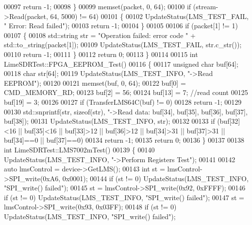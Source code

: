 \begin{DoxyCode}
00097         \textcolor{keywordflow}{return} -1;
00098     \}
00099     memset(packet, 0, 64);
00100     \textcolor{keywordflow}{if} (stream->Read(packet, 64, 5000) != 64)
00101     \{
00102         UpdateStatus(LMS_TEST_FAIL, \textcolor{stringliteral}{"  Error: Read failed"});
00103         \textcolor{keywordflow}{return} -1;
00104     \}
00105 
00106     \textcolor{keywordflow}{if} (packet[1] != 1)
00107     \{
00108         std::string str = \textcolor{stringliteral}{"Operation failed: error code "} + std::to\_string(packet[1]);
00109         UpdateStatus(LMS_TEST_FAIL, str.c\_str());
00110         \textcolor{keywordflow}{return} -1;
00111     \}
00112     \textcolor{keywordflow}{return} 0;
00113 \}
00114 
00115 \textcolor{keywordtype}{int} LimeSDRTest::FPGA_EEPROM_Test()
00116 \{
00117     \textcolor{keywordtype}{unsigned} \textcolor{keywordtype}{char} buf[64];
00118     \textcolor{keywordtype}{char} str[64];
00119     UpdateStatus(LMS_TEST_INFO, \textcolor{stringliteral}{"->Read EEPROM"});
00120 
00121     memset(buf, 0, 64);
00122     buf[0] = CMD_MEMORY_RD;
00123     buf[2] = 56;
00124     buf[13] = 7;                \textcolor{comment}{//read count}
00125     buf[19] = 3;
00126 
00127     \textcolor{keywordflow}{if} (TransferLMS64C(buf) != 0)
00128         \textcolor{keywordflow}{return} -1;
00129 
00130     std::snprintf(str, \textcolor{keyword}{sizeof}(str), \textcolor{stringliteral}{"->Read data: %
      buf[34], buf[35], buf[36], buf[37], buf[38]);
00131     UpdateStatus(LMS_TEST_INFO, str);
00132 
00133     \textcolor{keywordflow}{if} (buf[32]<16 || buf[35]<16 || buf[33]>12 || buf[36]>12 || buf[34]>31 || buf[37]>31 || buf[34]==0 || 
      buf[37]==0)
00134         \textcolor{keywordflow}{return} -1;
00135     \textcolor{keywordflow}{return} 0;
00136 \}
00137 
00138 \textcolor{keywordtype}{int} LimeSDRTest::LMS7002mTest()
00139 \{
00140     UpdateStatus(LMS_TEST_INFO, \textcolor{stringliteral}{"->Perform Registers Test"});
00141 
00142     \textcolor{keyword}{auto} lmsControl = device->GetLMS();
00143     \textcolor{keywordtype}{int} st = lmsControl->SPI_write(0xA6, 0x0001);
00144     \textcolor{keywordflow}{if} (st != 0)  UpdateStatus(LMS_TEST_INFO, \textcolor{stringliteral}{"SPI\_write() failed"});
00145     st = lmsControl->SPI_write(0x92, 0xFFFF);
00146     \textcolor{keywordflow}{if} (st != 0)  UpdateStatus(LMS_TEST_INFO, \textcolor{stringliteral}{"SPI\_write() failed"});
00147     st = lmsControl->SPI_write(0x93, 0x03FF);
00148     \textcolor{keywordflow}{if} (st != 0)  UpdateStatus(LMS_TEST_INFO, \textcolor{stringliteral}{"SPI\_write() failed"});
}
\end{DoxyCode}
